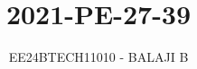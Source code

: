 \documentclass[journal]{IEEEtran}
\begin{document}

\vspace{3cm}

\title{2021-PE-27-39}
\author{EE24BTECH11010 - BALAJI B}
{\let\newpage\relax\maketitle}

\renewcommand{\thefigure}{\theenumi}
\renewcommand{\thetable}{\theenumi}
\setlength{\intextsep}{10pt} %


\renewcommand{\thetable}{\theenumi}
\end{document}

